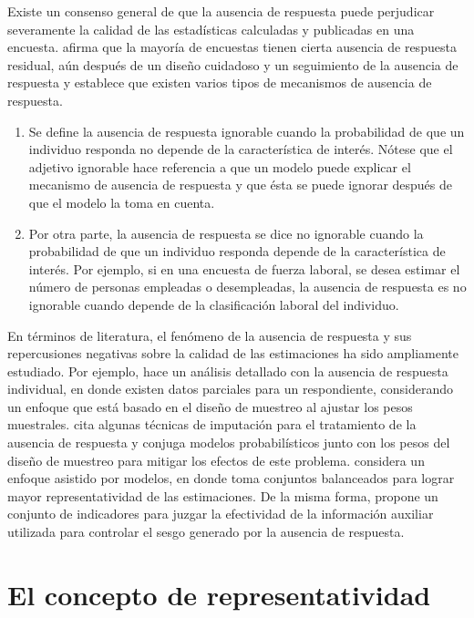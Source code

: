 \documentclass[
  12pt,
]{book}
\providecommand{\tightlist}{%
  \setlength{\itemsep}{0pt}\setlength{\parskip}{0pt}}
\begin{document}
Existe un consenso general de que la ausencia de respuesta puede perjudicar severamente la calidad de las estadísticas calculadas y publicadas en una encuesta. \citet{Lohr_2019} afirma que la mayoría de encuestas tienen cierta ausencia de respuesta residual, aún después de un diseño cuidadoso y un seguimiento de la ausencia de respuesta y establece que existen varios tipos de mecanismos de ausencia de respuesta.

\begin{enumerate}
\def\labelenumi{\arabic{enumi}.}
\tightlist
\item
  Se define la ausencia de respuesta ignorable cuando la probabilidad de que un individuo responda no depende de la característica de interés. Nótese que el adjetivo ignorable hace referencia a que un modelo puede explicar el mecanismo de ausencia de respuesta y que ésta se puede ignorar después de que el modelo la toma en cuenta.
\item
  Por otra parte, la ausencia de respuesta se dice no ignorable cuando la probabilidad de que un individuo responda depende de la característica de interés. Por ejemplo, si en una encuesta de fuerza laboral, se desea estimar el número de personas empleadas o desempleadas, la ausencia de respuesta es no ignorable cuando depende de la clasificación laboral del individuo.
\end{enumerate}

En términos de literatura, el fenómeno de la ausencia de respuesta y sus repercusiones negativas sobre la calidad de las estimaciones ha sido ampliamente estudiado. Por ejemplo, \citet[capítulo 9]{Lumley_2010} hace un análisis detallado con la ausencia de respuesta individual, en donde existen datos parciales para un respondiente, considerando un enfoque que está basado en el diseño de muestreo al ajustar los pesos muestrales. \citet[capítulo 5]{Fuller} cita algunas técnicas de imputación para el tratamiento de la ausencia de respuesta y conjuga modelos probabilísticos junto con los pesos del diseño de muestreo para mitigar los efectos de este problema. \citet{Sar1} considera un enfoque asistido por modelos, en donde toma conjuntos balanceados para lograr mayor representatividad de las estimaciones. De la misma forma, \citet{Sar2} propone un conjunto de indicadores para juzgar la efectividad de la información auxiliar utilizada para controlar el sesgo generado por la ausencia de respuesta.

\hypertarget{el-concepto-de-representatividad}{%
\section{El concepto de representatividad}\label{el-concepto-de-representatividad}}
\end{document}
